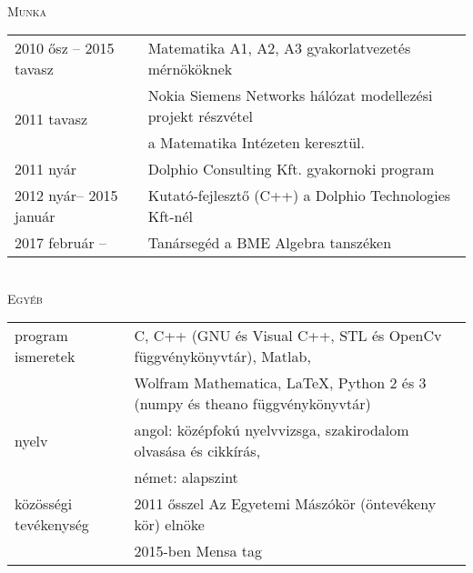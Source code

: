 \documentclass[12pt]{article}
\begin{document}
	\vspace{0.3cm}
 \\
 \textsc{Munka}
 \vspace{0.3cm}
 \\
       \begin{tabular}{p{3.5cm}l}
	       2010 ősz -- 2015 tavasz & Matematika A1, A2, A3 gyakorlatvezetés mérnököknek\\
           \multirow{2}{*}[8pt]{2011 tavasz}  & Nokia Siemens Networks hálózat modellezési projekt részvétel\\ & a Matematika Intézeten keresztül. \\
		   2011 nyár    & Dolphio Consulting Kft. gyakornoki program\\
		   2012 nyár-- 2015 január & Kutató-fejlesztő (C++) a Dolphio Technologies Kft-nél \\
           2017 február -- & Tanársegéd a BME Algebra tanszéken
       \end{tabular}
 \vspace{0.3cm}
 \\
 \textsc{Egyéb}
 \vspace{0.3cm}
 \\
        \begin{tabular}{p{3.5cm}l}
	       program ismeretek &  C, C++ (GNU és Visual C++, STL és OpenCv függvénykönyvtár), Matlab, \\
                             & Wolfram Mathematica, \LaTeX, Python 2 és 3 (numpy és theano függvénykönyvtár) \\
           nyelv & angol: középfokú nyelvvizsga, szakirodalom olvasása és cikkírás, \\
                 & német: alapszint\\
		   közösségi tevékenység  & 2011 ősszel Az Egyetemi Mászókör (öntevékeny kör) elnöke \\
                                  & 2015-ben Mensa tag
       \end{tabular}
\end{document}
